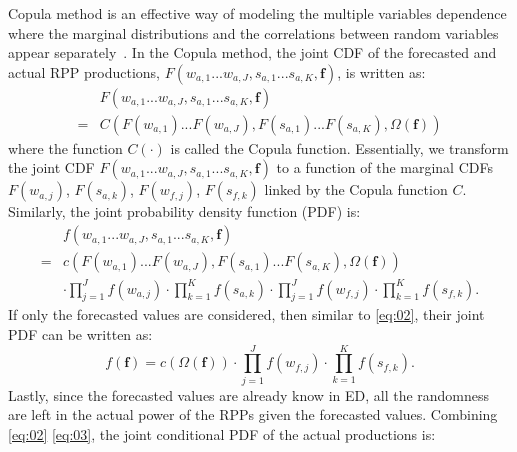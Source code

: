 Copula method is an effective way of modeling the multiple variables dependence where the marginal distributions and the correlations between random variables appear separately~\cite{copula_Zhang,WytockEtAl2013}.
In the Copula method, the joint CDF of the forecasted and actual RPP productions, $F(w_{a,{1} }. . .w_{a,J},s_{a,{1}}. . .s_{a,K},\mathbf{f})$, is written as:
\begin{equation} \label{eq:01}
\begin{aligned}
& F(w_{a,{1} }. . .w_{a,J},s_{a,{1}}. . .s_{a,K},\mathbf{f}) \\
= & C(F(w_{a,{1}})...F(w_{a,J}),F(s_{a,{1}})...F(s_{a,K}), \Omega(\mathbf{f}))
\end{aligned}
\end{equation}
where the function $C(\cdot)$ is called the Copula function. Essentially, we transform the joint CDF  $F(w_{a,{1} }. . .w_{a,J},s_{a,{1}}. . .s_{a,K},\mathbf{f})$ to a function of the marginal CDFs  $F(w_{a,j})$, $F(s_{a,k})$, $F(w_{f,j})$, $F(s_{f,k})$ linked by the Copula function $C$. Similarly, the joint probability density function (PDF) is:
\begin{equation} \label{eq:02}
\begin{aligned}
& f(w_{a,{1} }. . .w_{a,J},s_{a,{1}}. . .s_{a,K},\mathbf{f}) \\
= & c(F(w_{a,{1}})...F(w_{a,J}),F(s_{a,{1}})...F(s_{a,K}), \Omega(\mathbf{f}))\\
& \cdot \prod_{j=1}^{J}f(w_{a,{j}}) \cdot \prod_{k=1}^{K}f(s_{a,{k}}) \cdot \prod_{j=1}^{J}f(w_{f,{j}}) \cdot \prod_{k=1}^{K} f(s_{f,{k}}).
\end{aligned}
\end{equation}
If only the forecasted values are considered, then similar to \eqref{eq:02}, their joint PDF can be written as:
\begin{equation} \label{eq:03}
f(\mathbf{f})= c(\Omega(\mathbf{f})) \cdot \prod_{j=1}^{J}f(w_{f,{j}}) \cdot \prod_{k=1}^{K} f(s_{f,{k}}).
\end{equation}
Lastly, since the forecasted values are already know in ED, all the randomness are left in the actual power of the RPPs given the forecasted values. Combining \eqref{eq:02} \eqref{eq:03}, the joint conditional PDF of the actual productions is:
